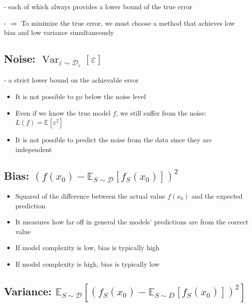 - each of which always provides a lower bound of the true error

- $\Rightarrow$ To minimize the true error, we must choose a method that achieves low bias and low variance simultaneously

\subsection*{Noise: $\operatorname{Var}_{\varepsilon \sim \mathscr{D}_{\varepsilon}}[\varepsilon]$}

- a strict lower bound on the achievable error

\begin{itemize}
  \item It is not possible to go below the noise level

  \item Even if we know the true model $f$, we still suffer from the noise: $L(f)=\mathbb{E}\left[\varepsilon^{2}\right]$

  \item It is not possible to predict the noise from the data since they are independent

\end{itemize}

\subsection*{Bias: $\left(f\left(x_{0}\right)-\mathbb{E}_{S \sim \mathscr{D}}\left[f_{S}\left(x_{0}\right)\right]\right)^{2}$}

\begin{itemize}
  \item Squared of the difference between the actual value $f\left(x_{0}\right)$ and the expected prediction

  \item It measures how far off in general the models' predictions are from the correct value

  \item If model complexity is low, bias is typically high

  \item If model complexity is high, bias is typically low

\end{itemize}

\subsection*{Variance: $\mathbb{E}_{S \sim \mathscr{D}}\left[\left(f_{S}\left(x_{0}\right)-\mathbb{E}_{S \sim D}\left[f_{S}\left(x_{0}\right)\right]\right)^{2}\right]$}

